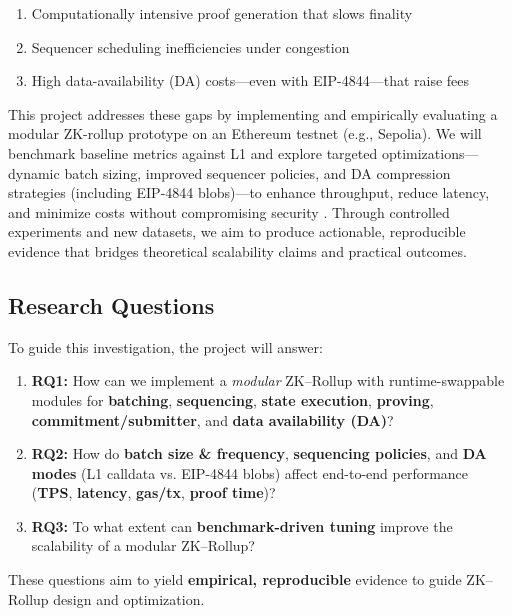 \begin{enumerate}
  \item Computationally intensive proof generation that slows finality
  \item Sequencer scheduling inefficiencies under congestion
  \item High data-availability (DA) costs---even with EIP-4844---that raise fees
\end{enumerate}

\vspace{12pt}

This project addresses these gaps by implementing and empirically evaluating a modular ZK-rollup prototype on an Ethereum testnet (e.g., Sepolia). We will benchmark baseline metrics against L1 and explore targeted optimizations---dynamic batch sizing, improved sequencer policies, and DA compression strategies (including EIP-4844 blobs)---to enhance throughput, reduce latency, and minimize costs without compromising security \cite{chaliasos2024analyzing}. Through controlled experiments and new datasets, we aim to produce actionable, reproducible evidence that bridges theoretical scalability claims and practical outcomes.


\subsection{Research Questions}
\vspace{12pt}

To guide this investigation, the project will answer:

\begin{enumerate}
  \item \textbf{RQ1:} How can we implement a \emph{modular} ZK–Rollup with runtime-swappable modules for \textbf{batching}, \textbf{sequencing}, \textbf{state execution}, \textbf{proving}, \textbf{commitment/submitter}, and \textbf{data availability (DA)}?
  \item \textbf{RQ2:} How do \textbf{batch size \& frequency}, \textbf{sequencing policies}, and \textbf{DA modes} (L1 calldata vs. EIP-4844 blobs) affect end-to-end performance (\textbf{TPS}, \textbf{latency}, \textbf{gas/tx}, \textbf{proof time})?
  \item \textbf{RQ3:} To what extent can \textbf{benchmark-driven tuning} improve the scalability of a modular ZK–Rollup?
\end{enumerate}

These questions aim to yield \textbf{empirical, reproducible} evidence to guide ZK–Rollup design and optimization.

